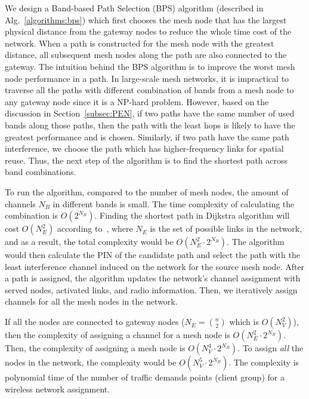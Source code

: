 We design a Band-based Path Selection (BPS) algorithm
(described in Alg.~\ref{algorithms:bps}) which first chooses the 
mesh node that has the largest physical distance from the gateway 
nodes to reduce the whole time cost of the network. When a path is constructed for
the mesh node with the greatest distance, all subsequent mesh nodes along
the path are also connected to the gateway. The intuition behind the
BPS algorithm is to improve the worst mesh node performance in a path.
In large-scale mesh networks, it is impractical to traverse all the paths with
different combination of bands from a mesh node to any gateway node since 
it is a NP-hard problem. However,
based on the discussion in Section~\ref{subsec:PEN}, if two paths have the same
number of used bands along those paths, then the path with the least hops
is likely to have the greatest performance and is chosen.  Similarly, if
two path have the same path interference, we choose the path which has
higher-frequency links for spatial reuse. Thus, the next step of the
algorithm is to find the shortest path across band combinations.

To run the algorithm, compared to the number of mesh nodes, the amount of channels $N_B$ in
different bands is small. The time complexity of calculating the combination
is $O(2^{N_B})$. Finding the shortest path in Dijkstra algorithm will
cost $O(N_E^2)$ according to~\cite{golden1976shortest}, where $N_E$ is the set of possible links in the
network, and as a result, the total complexity would be $O(N_E^2\cdot 2^{N_B})$.
The algorithm would then calculate the PIN of the candidate path and select the path
with the least interference channel induced on the network for the source mesh node.
After a path is assigned, the algorithm updates the network's channel assignment
with served nodes, activated links, and radio information. Then,
we iteratively assign channels for all the mesh nodes in the
network.

If all the nodes are connected to gateway nodes ($N_E={n \choose 2}$ which is $O(N_V^2)$), 
then the complexity of assigning a channel for a mesh node is $O(N_E^2\cdot2^{N_B})$. 
Then, the complexity of assigning a mesh node is $O(N_V^4\cdot2^{N_B})$.
To assign {\it all} the nodes in the network, the complexity would 
be $O(N_V^5\cdot2^{N_B})$. The complexity is polynomial time of
the number of traffic demands points (client group) for a wireless
network assignment.


